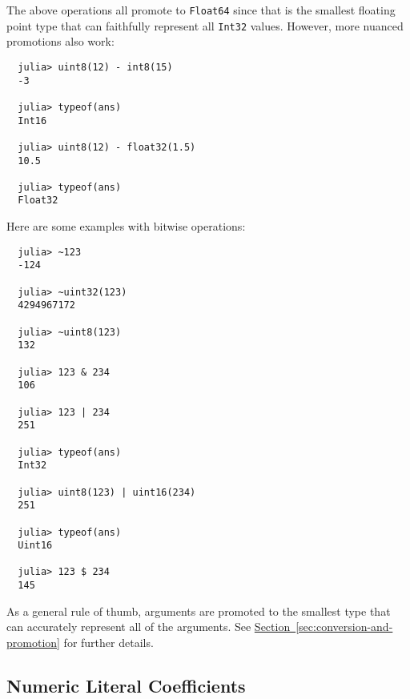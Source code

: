 \documentclass{article}
\newcommand{\Section}[1]{\hyperref[sec:#1]{Section~\ref*{sec:#1}}}
\begin{document}
The above operations all promote to \verb|Float64| since that is the smallest floating point type that can faithfully represent all \verb|Int32| values.
However, more nuanced promotions also work:
\begin{verbatim}
  julia> uint8(12) - int8(15)
  -3

  julia> typeof(ans)
  Int16

  julia> uint8(12) - float32(1.5)
  10.5

  julia> typeof(ans)
  Float32
\end{verbatim}
Here are some examples with bitwise operations:
\begin{verbatim}
  julia> ~123
  -124

  julia> ~uint32(123)
  4294967172

  julia> ~uint8(123)
  132

  julia> 123 & 234
  106

  julia> 123 | 234
  251

  julia> typeof(ans)
  Int32

  julia> uint8(123) | uint16(234)
  251

  julia> typeof(ans)
  Uint16

  julia> 123 $ 234
  145
\end{verbatim}
As a general rule of thumb, arguments are promoted to the smallest type that can accurately represent all of the arguments. See \Section{conversion-and-promotion} for further details.

\subsection{Numeric Literal Coefficients}
\end{document}
